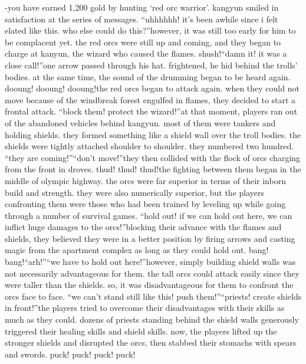 -you have earned 1,200 gold by hunting ‘red orc warrior’.
kangyun smiled in satisfaction at the series of messages.
“uhhhhhh! it’s been awhile since i felt elated like this.
 who else could do this?”however, it was still too early for him to be complacent yet.
 the red orcs were still up and coming, and they began to charge at kanyun, the wizard who caused the flames.
shush!“damn it! it was a close call!”one arrow passed through his hat.
 frightened, he hid behind the trolls’ bodies.
at the same time, the sound of the drumming began to be heard again.
dooung! dooung! dooung!the red orcs began to attack again.
 when they could not move because of the windbreak forest engulfed in flames, they decided to start a frontal attack.
“block them! protect the wizard!”at that moment, players ran out of the abandoned vehicles behind kangyun.
most of them were tankers and holding shields.
 they formed something like a shield wall over the troll bodies.
 the shields were tightly attached shoulder to shoulder.
 they numbered two hundred.
“they are coming!”“don’t move!”they then collided with the flock of orcs charging from the front in droves.
thud! thud! thud!the fighting between them began in the middle of olympic highway.
 the orcs were far superior in terms of their inborn build and strength.
 they were also numerically superior, but the players confronting them were those who had been trained by leveling up while going through a number of survival games.
“hold out! if we can hold out here, we can inflict huge damages to the orcs!”blocking their advance with the flames and shields, they believed they were in a better position by firing arrows and casting magic from the apartment complex as long as they could hold out.
bang! bang!“arh!”“we have to hold out here!”however, simply building shield walls was not necessarily advantageous for them.
 the tall orcs could attack easily since they were taller than the shields.
 so, it was disadvantageous for them to confront the orcs face to face.
“we can’t stand still like this! push them!”“priests! create shields in front!”the players tried to overcome their disadvantages with their skills as much as they could.
dozens of priests standing behind the shield walls generously triggered their healing skills and shield skills.
now, the players lifted up the stronger shields and disrupted the orcs, then stabbed their stomachs with spears and swords.
puck! puck! puck! puck!

